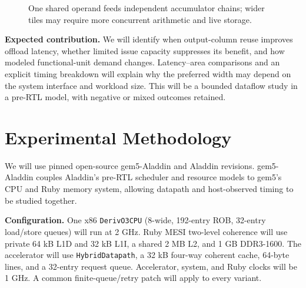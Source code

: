 \documentclass[10pt,letterpaper]{article}
\begin{document}
\begin{figure}[h!]
\centering
{}
\caption{One shared operand feeds independent accumulator chains; wider tiles may require more concurrent arithmetic and live storage.}
\end{figure}

\textbf{Expected contribution.} We will identify when output-column reuse improves offload latency, whether limited issue capacity suppresses its benefit, and how modeled functional-unit demand changes. Latency--area comparisons and an explicit timing breakdown will explain why the preferred width may depend on the system interface and workload size. This will be a bounded dataflow study in a pre-RTL model, with negative or mixed outcomes retained.

\newpage
\section{Experimental Methodology}
We will use pinned open-source gem5-Aladdin and Aladdin revisions. gem5-Aladdin couples Aladdin's pre-RTL scheduler and resource models to gem5's CPU and Ruby memory system, allowing datapath and host-observed timing to be studied together.

\textbf{Configuration.} One x86 \texttt{DerivO3CPU} (8-wide, 192-entry ROB, 32-entry load/store queues) will run at 2 GHz. Ruby MESI two-level coherence will use private 64 kB L1D and 32 kB L1I, a shared 2 MB L2, and 1 GB DDR3-1600. The accelerator will use \texttt{HybridDatapath}, a 32 kB four-way coherent cache, 64-byte lines, and a 32-entry request queue. Accelerator, system, and Ruby clocks will be 1 GHz. A common finite-queue/retry patch will apply to every variant.
\end{document}
